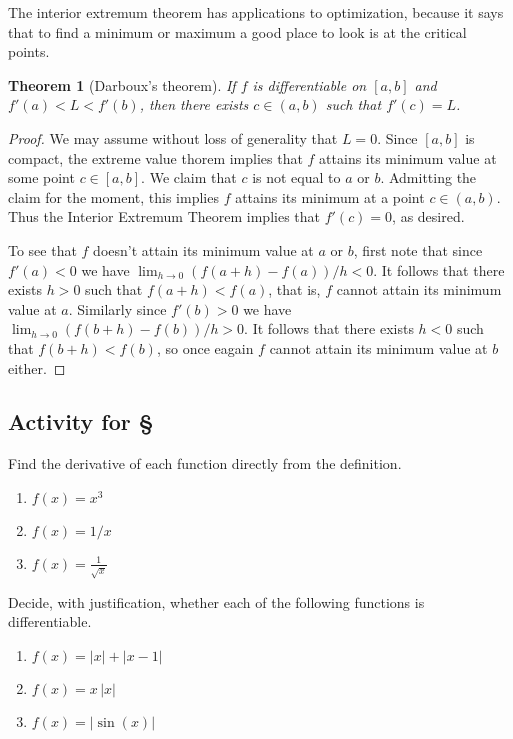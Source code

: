 \documentclass[11pt,oneside]{amsbook}
\theoremstyle{definition}
\theoremstyle{plain}
\newtheorem{theorem}{Theorem}[section]
\theoremstyle{definition}
\theoremstyle{remark}
\numberwithin{equation}{section}
\numberwithin{figure}{section}
\newcounter{activityitem}
\newenvironment{activity}{\begin{list}{\arabic{activityitem}.}{\usecounter{activityitem}\setlength{\itemsep}{.2in}}}{\end{list}}
\begin{document}
The interior extremum theorem has applications to optimization, because it says that to find a minimum or maximum a good place to look is at the critical points.

\begin{theorem}[Darboux's theorem]
  If $f$ is differentiable on $[a,b]$ and $f'(a)<L<f'(b)$, then there exists $c\in(a,b)$ such that $f'(c)=L$.
\end{theorem}

\begin{proof}
  We may assume without loss of generality that $L=0$. Since $[a,b]$ is compact, the extreme value thorem implies that $f$ attains its minimum value at some point $c\in[a,b]$. We claim that $c$ is not equal to $a$ or $b$. Admitting the claim for the moment, this implies $f$ attains its minimum at a point $c\in(a,b)$. Thus the Interior Extremum Theorem implies that $f'(c)=0$, as desired.

  To see that $f$ doesn't attain its minimum value at $a$ or $b$, first note that since $f'(a)<0$ we have $\lim_{h\to0}(f(a+h)-f(a))/h<0$. It follows that there exists $h>0$ such that $f(a+h)<f(a)$, that is, $f$ cannot attain its minimum value at $a$. Similarly since $f'(b)>0$ we have $\lim_{h\to0}(f(b+h)-f(b))/h>0$. It follows that there exists $h<0$ such that $f(b+h)<f(b)$, so once eagain $f$ cannot attain its minimum value at $b$ either.
\end{proof}

\newpage
\subsection*{Activity for \S \thesection}

\begin{activity}
  \item Find the derivative of each function directly from the definition.
  \begin{enumerate}
    \item $\displaystyle f(x)=x^3$
    \item $\displaystyle f(x)=1/x$
    \item $\displaystyle f(x)=\frac{1}{\sqrt{x}}$
  \end{enumerate}
  \item Decide, with justification, whether each of the following functions is differentiable.
  \begin{enumerate}
    \item $\displaystyle f(x)=|x|+|x-1|$
    \item $\displaystyle f(x)=x\,|x|$
    \item $\displaystyle f(x)=|\sin(x)|$
  \end{enumerate}
\end{activity}
  
\end{document}
